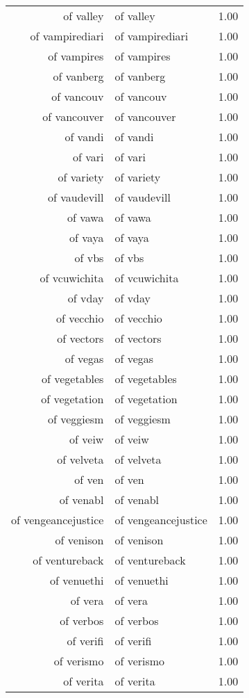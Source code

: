 \begin{table}[ht]
\begin{tabular}{rlr}
  of valley & of valley & 1.00 \\ 
  of vampirediari & of vampirediari & 1.00 \\ 
  of vampires & of vampires & 1.00 \\ 
  of vanberg & of vanberg & 1.00 \\ 
  of vancouv & of vancouv & 1.00 \\ 
  of vancouver & of vancouver & 1.00 \\ 
  of vandi & of vandi & 1.00 \\ 
  of vari & of vari & 1.00 \\ 
  of variety & of variety & 1.00 \\ 
  of vaudevill & of vaudevill & 1.00 \\ 
  of vawa & of vawa & 1.00 \\ 
  of vaya & of vaya & 1.00 \\ 
  of vbs & of vbs & 1.00 \\ 
  of vcuwichita & of vcuwichita & 1.00 \\ 
  of vday & of vday & 1.00 \\ 
  of vecchio & of vecchio & 1.00 \\ 
  of vectors & of vectors & 1.00 \\ 
  of vegas & of vegas & 1.00 \\ 
  of vegetables & of vegetables & 1.00 \\ 
  of vegetation & of vegetation & 1.00 \\ 
  of veggiesm & of veggiesm & 1.00 \\ 
  of veiw & of veiw & 1.00 \\ 
  of velveta & of velveta & 1.00 \\ 
  of ven & of ven & 1.00 \\ 
  of venabl & of venabl & 1.00 \\ 
  of vengeancejustice & of vengeancejustice & 1.00 \\ 
  of venison & of venison & 1.00 \\ 
  of ventureback & of ventureback & 1.00 \\ 
  of venuethi & of venuethi & 1.00 \\ 
  of vera & of vera & 1.00 \\ 
  of verbos & of verbos & 1.00 \\ 
  of verifi & of verifi & 1.00 \\ 
  of verismo & of verismo & 1.00 \\ 
  of verita & of verita & 1.00 \\ 

\end{tabular}
\end{table}
